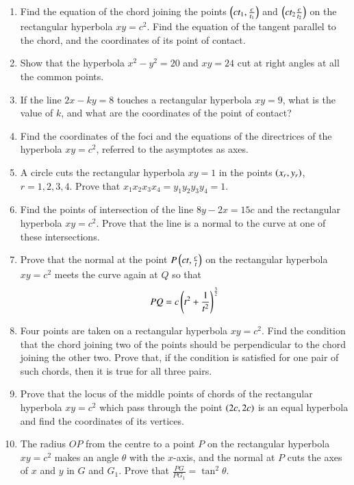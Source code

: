 \begin{enumerate}[label=\arabic*.,ref=\thesubsection.\theenumi]
\item Find the equation of the chord joining the points $\left(ct_1,\frac{c}{t_1}\right)$ and $\left(ct_2\frac{c}{t_2}\right)$ on the rectangular 
hyperbola $xy=c^2$.  Find the equation of the tangent parallel to the chord, and the coordinates
of its point of contact.
\item Show that the hyperbola $x^2-y^2=20$ and $xy=24$ cut at right angles at all the common points.
\item If the line $2x-ky=8$ touches a rectangular hyperbola $xy=9$, what is the value of $k$, and
what are the coordinates of the point of contact?
\item Find the coordinates of the foci and the equations of the directrices of the 
hyperbola $xy=c^2$, referred to the asymptotes as axes.
\item A circle cuts the rectangular hyperbola $xy=1$ in the points $\left(x_r,y_r\right)$, $r=1,2,3,4$.  Prove 
that $x_1x_2x_3x_4 = y_1y_2y_3y_4=1$.
\item Find the points of intersection of the line $8y-2x=15c$ and the rectangular hyperbola $xy=c^2$.  Prove
that the line is a normal to the curve at one of these intersections.
\item Prove that the normal at the point $P \left(ct,\frac{c}{t}\right)$ on the rectangular hyperbola $xy=c^2$
meets the curve again at $Q$ so that
\begin{equation}
PQ=c\left(t^2+\frac{1}{t^2}\right)^{\frac{3}{2}}
\end{equation}
\item Four points are taken on a rectangular hyperbola $xy=c^2$.  Find the condition that
the chord joining two of the points should be perpendicular to the chord joining
the other two.  Prove that, if the condition is satisfied for one pair of such chords, then
it is true for all three pairs.
\item Prove that the locus of the middle points of chords of the rectangular
hyperbola $xy=c^2$ which pass through the point $\left(2c,2c\right)$ is an equal hyperbola and find the coordinates
of its vertices.
\item The radius $OP$ from the centre to a point $P$ on the rectangular hyperbola $xy=c^2$ makes
an angle $\theta$ with the $x$-axis, and the normal at $P$ cuts the axes of $x$ and $y$ in $G$ and $G_1$.
Prove that $\frac{PG}{PG_1}=\tan^2\theta$.
\end{enumerate}
